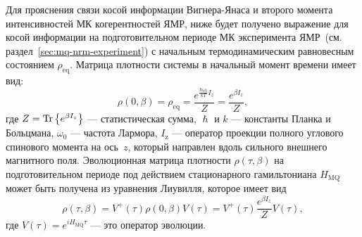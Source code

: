Для прояснения связи косой информации Вигнера-Янаса и
второго момента интенсивностей МК когерентностей ЯМР,
ниже будет получено выражение для косой информации
на подготовительном периоде МК эксперимента ЯМР~(см. раздел~\ref{sec:mq-nrm-experiment})
с начальным термодинамическим равновесным состоянием $\rho_\mathrm{eq}$.
Матрица плотности системы в начальный момент времени имеет вид:
\begin{equation}
  \rho(0, \beta)
  = \rho_\mathrm{eq}
  = \dfrac{e^{\frac{\hbar\omega_{0}}{kT} I_z}}{Z}
  = \dfrac{e^{\beta I_z}}{Z},
\end{equation}
где $Z = \mathrm{Tr} \left\{ e^{\beta I_z} \right\}$ --- статистическая сумма,
$\hslash$ и $k$ --- константы Планка и Больцмана,
$\omega_{0}$ --- частота Лармора,
$I_\mathrm{z}$ ---  оператор проекции полного углового спинового момента  на ось~$z$,
который направлен вдоль сильного внешнего магнитного поля.
Эволюционная матрица плотности $\rho(\tau,\beta)$ на подготовительном периоде
под действием стационарного гамильтониана $H_\mathrm{MQ}$
может быть получена из уравнения Лиувилля,
которое имеет вид
%
\begin{equation}\label{eq:rho-eval}
  \rho(\tau,\beta)
  = V^+(\tau) \rho(0, \beta) V(\tau)
  = V^+(\tau) \frac{e^{\beta I_z}}{Z} V(\tau),
\end{equation}
где $V(\tau) = e^{iH_\mathrm{MQ}\tau}$
--- это оператор эволюции.

